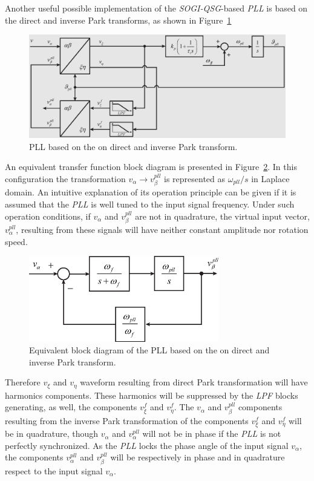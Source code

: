 \documentclass[11pt,a4paper,oneside]{book}
\numberwithin{equation}{section}
\theoremstyle{it}
\theoremstyle{definition}
\begin{document}
Another useful possible implementation of the \textit{SOGI-QSG}-based \textit{PLL} is based on the direct and inverse Park transforms, as shown in Figure~\ref{park_pll_1}
\begin{figure}[H]
	\centering
	\includegraphics[width = 495pt, angle = 0, keepaspectratio]{figures/single_phase_pll_fig1b.eps}
	\captionsetup{width=0.5\textwidth, font=small}	
	\caption{PLL based on the on direct and inverse Park transform.}
	\label{park_pll_1}
\end{figure}
\begin{multicols}{2}
An equivalent transfer function block diagram is presented in Figure~\ref{park_pll_2}. In this configuration the transformation $v_\alpha\rightarrow v_\beta^{pll}$ is represented as $\omega_{pll}/s$ in Laplace domain. An intuitive explanation of its operation principle can be given if it is assumed that the \textit{PLL} is well tuned to the input signal frequency. Under such operation conditions, if $v_\alpha$ and $v_\beta^{pll}$ are not in quadrature, the virtual input vector, $v_\alpha^{pll}$, resulting from these signals will have neither constant amplitude nor rotation speed.
	\begin{figure}[H]
	\centering
	\includegraphics[width = 235pt, angle = 0, keepaspectratio]{figures/qsg_park_eq_1.eps}
	\captionsetup{width=0.35\textwidth, font=small}	
	\caption{Equivalent block diagram of the PLL based on the on direct and inverse Park transform.}
	\label{park_pll_2}
\end{figure}
 Therefore $v_\xi$ and $v_\eta$ waveform resulting from direct Park transformation will have harmonics components. These harmonics will be suppressed by the \textit{LPF} blocks generating, as well, the components $v_\xi^f$ and $v_\eta^f$. The $v_\alpha$ and $v_\beta^{pll}$ components resulting from the inverse Park transformation of the components $v_\xi^f$ and $v_\eta^f$ will be in quadrature, though $v_\alpha$ and $v_\alpha^{pll}$ will not be in phase if the \textit{PLL} is not perfectly synchronized. As the \textit{PLL} locks the phase angle of the input signal $v_\alpha$, the components $v_\alpha^{pll}$ and $v_\beta^{pll}$ will be respectively in phase and in quadrature respect to the input signal $v_\alpha$.
\end{multicols}
\end{document}
